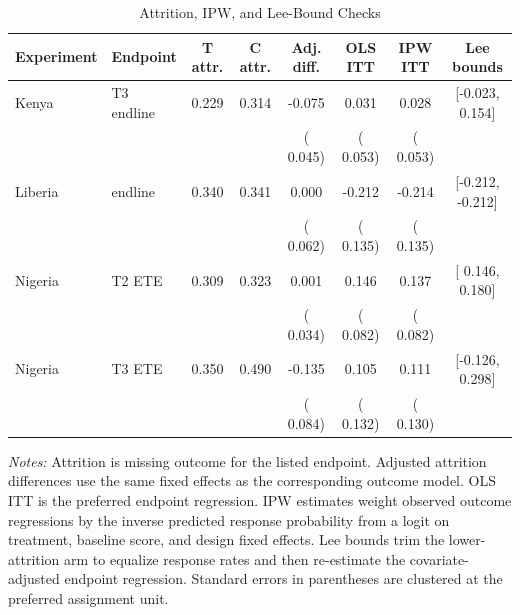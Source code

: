\begin{table}[H]
\centering
\caption{Attrition, IPW, and Lee-Bound Checks}
\label{tab:rnr_attrition_bounds}
\begin{threeparttable}
\scriptsize
\setlength{\tabcolsep}{3pt}
\begin{tabular}[t]{llcccccc}
\toprule
Experiment & Endpoint & T attr. & C attr. & Adj. diff. & OLS ITT & IPW ITT & Lee bounds \\
\midrule
Kenya & T3 endline & 0.229 & 0.314 & -0.075 &  0.031 &  0.028 & [-0.023,  0.154] \\
 & & & & ( 0.045) & ( 0.053) & ( 0.053) & \\
Liberia & endline & 0.340 & 0.341 &  0.000 & -0.212 & -0.214 & [-0.212, -0.212] \\
 & & & & ( 0.062) & ( 0.135) & ( 0.135) & \\
Nigeria & T2 ETE & 0.309 & 0.323 &  0.001 &  0.146 &  0.137 & [ 0.146,  0.180] \\
 & & & & ( 0.034) & ( 0.082) & ( 0.082) & \\
Nigeria & T3 ETE & 0.350 & 0.490 & -0.135 &  0.105 &  0.111 & [-0.126,  0.298] \\
 & & & & ( 0.084) & ( 0.132) & ( 0.130) & \\
\bottomrule
\end{tabular}
\begin{tablenotes}
\footnotesize
\item \textit{Notes:} Attrition is missing outcome for the listed endpoint. Adjusted attrition differences use the same fixed effects as the corresponding outcome model. OLS ITT is the preferred endpoint regression. IPW estimates weight observed outcome regressions by the inverse predicted response probability from a logit on treatment, baseline score, and design fixed effects. Lee bounds trim the lower-attrition arm to equalize response rates and then re-estimate the covariate-adjusted endpoint regression. Standard errors in parentheses are clustered at the preferred assignment unit.
\end{tablenotes}
\end{threeparttable}
\end{table}
